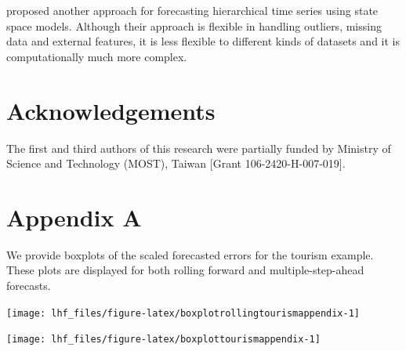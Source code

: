 \documentclass[11pt,a4paper,]{article}
\let\origfigure\figure
\let\endorigfigure\endfigure
\renewenvironment{figure}[1][2] {
    \expandafter\origfigure\expandafter[!htbp]
} {
    \endorigfigure
}
\begin{document}
\textcite{pennings2017} proposed another approach for forecasting
hierarchical time series using state space models. Although their
approach is flexible in handling outliers, missing data and external
features, it is less flexible to different kinds of datasets and it is
computationally much more complex.

\hypertarget{acknowledgements}{%
\section*{Acknowledgements}\label{acknowledgements}}

The first and third authors of this research were partially funded by
Ministry of Science and Technology (MOST), Taiwan {[}Grant
106-2420-H-007-019{]}.

\clearpage

\hypertarget{appendixA}{%
\section*{Appendix A}\label{appendixA}}

We provide boxplots of the scaled forecasted errors for the tourism
example. These plots are displayed for both rolling forward and
multiple-step-ahead forecasts.

\begin{figure}

{\centering \texttt{[image: lhf\_files/figure-latex/boxplotrollingtourismappendix-1]} 

}

\caption{Box plots of scaled forecast errors from reconciled and unreconciled ETS, ARIMA and OLS methods at each hierarchical level for rolling origin 1-step-ahead tourism demand.}\label{fig:boxplotrollingtourismappendix}
\end{figure}

\begin{figure}

{\centering \texttt{[image: lhf\_files/figure-latex/boxplottourismappendix-1]} 

}

\caption{Box plots of scaled forecast errors from reconciled and unreconciled ETS, ARIMA and OLS methods at each hierarchical level for fixed origin multi-step-ahead tourism demand.}\label{fig:boxplottourismappendix}
\end{figure}

\clearpage

\printbibliography
\end{document}
